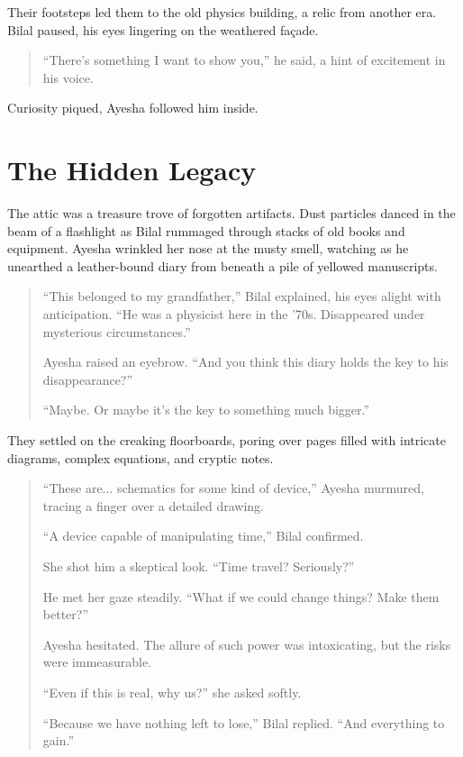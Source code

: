 \documentclass[12pt]{book}
\begin{document}
Their footsteps led them to the old physics building, a relic from another era. Bilal paused, his eyes lingering on the weathered façade.

\begin{quote}
    ``There's something I want to show you,'' he said, a hint of excitement in his voice.
\end{quote}

Curiosity piqued, Ayesha followed him inside.

\chapter{The Hidden Legacy}

The attic was a treasure trove of forgotten artifacts. Dust particles danced in the beam of a flashlight as Bilal rummaged through stacks of old books and equipment. Ayesha wrinkled her nose at the musty smell, watching as he unearthed a leather-bound diary from beneath a pile of yellowed manuscripts.

\begin{quote}
    ``This belonged to my grandfather,'' Bilal explained, his eyes alight with anticipation. ``He was a physicist here in the '70s. Disappeared under mysterious circumstances.''

    Ayesha raised an eyebrow. ``And you think this diary holds the key to his disappearance?''

    ``Maybe. Or maybe it's the key to something much bigger.''
\end{quote}

They settled on the creaking floorboards, poring over pages filled with intricate diagrams, complex equations, and cryptic notes.

\begin{quote}
    ``These are... schematics for some kind of device,'' Ayesha murmured, tracing a finger over a detailed drawing.

    ``A device capable of manipulating time,'' Bilal confirmed.

    She shot him a skeptical look. ``Time travel? Seriously?''

    He met her gaze steadily. ``What if we could change things? Make them better?''

    Ayesha hesitated. The allure of such power was intoxicating, but the risks were immeasurable.

    ``Even if this is real, why us?'' she asked softly.

    ``Because we have nothing left to lose,'' Bilal replied. ``And everything to gain.''
\end{quote}
\end{document}
